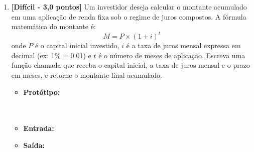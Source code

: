 \begin{enumerate}[label=\textbf{Q\arabic*.}, start=1]
\begin{itemize}[leftmargin=*]
    \item \textbf{Dica:} O operador de divisão inteira \code{//} obtém a quantidade inteira de vezes que um número cabe no outro (ex.:  resulta em ), enquanto o operador módulo \code{\%} obtém o resto da divisão (ex.:  resulta em ).
    \item \textbf{Protótipo:}\newline {}\\\\\\
    \item \textbf{Entrada:} 
    \item \textbf{Saída:} 
\end{itemize}



\vspace{0.4cm}

\item \textbf{[Difícil - 3,0 pontos]} Um investidor deseja calcular o montante acumulado em uma aplicação de renda fixa sob o regime de juros compostos. A fórmula matemática do montante é:
\[
M = P \times (1 + i)^t
\]
onde $P$ é o capital inicial investido, $i$ é a taxa de juros mensal expressa em decimal (ex: 1\% = 0.01) e $t$ é o número de meses de aplicação. Escreva uma função chamada  que receba o capital inicial, a taxa de juros mensal e o prazo em meses, e retorne o montante final acumulado.

\begin{itemize}[leftmargin=*]
    \item \textbf{Protótipo:}\newline {}\\\\\\
    \item \textbf{Entrada:} 
    \item \textbf{Saída:} 
\end{itemize}



\vspace{0.4cm}

\end{enumerate}


